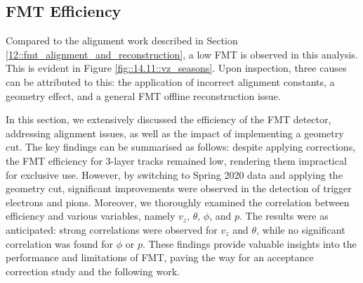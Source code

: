 \subsection{FMT Efficiency}
\label{14.10::fmt_efficiency}
    Compared to the alignment work described in Section \ref{12::fmt_alignment_and_reconstruction}, a low FMT is observed in this analysis.
    This is evident in Figure \ref{fig::14.11::vz_seasons}.
    Upon inspection, three causes can be attributed to this: the application of incorrect alignment constants, a geometry effect, and a general FMT offline reconstruction issue.

    In this section, we extensively discussed the efficiency of the FMT detector, addressing alignment issues, as well as the impact of implementing a geometry cut.
    The key findings can be summarised as follows: despite applying corrections, the FMT efficiency for 3-layer tracks remained low, rendering them impractical for exclusive use.
    However, by switching to Spring 2020 data and applying the geometry cut, significant improvements were observed in the detection of trigger electrons and pions.
    Moreover, we thoroughly examined the correlation between efficiency and various variables, namely $v_z$, $\theta$, $\phi$, and $p$.
    The results were as anticipated: strong correlations were observed for $v_z$ and $\theta$, while no significant correlation was found for $\phi$ or $p$.
    These findings provide valuable insights into the performance and limitations of FMT, paving the way for an acceptance correction study and the following work.

    
    
    
    
